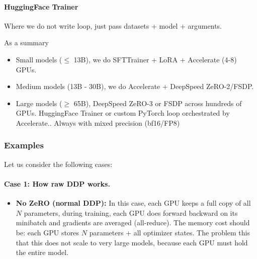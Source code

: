 \documentclass[11pt]{article}  %
\begin{document}
\paragraph{HuggingFace Trainer}
Where we do not write loop, just pass datasets + model + arguments.

As a summary 
\begin{itemize}
  \item Small models ($\leq$ 13B), we do SFTTrainer + LoRA + Accelerate (4-8) GPUs.
  \item Medium models (13B - 30B), we do Accelerate + DeepSpeed ZeRO-2/FSDP.
  \item Large models ($\geq$ 65B), DeepSpeed ZeRO-3 or FSDP across hundreds of GPUs. HuggingFace Trainer or custom PyTorch loop orchestrated by Accelerate.. Always with mixed precision (bf16/FP8)
\end{itemize}


\subsubsection{Examples}
Let us consider the following cases:

\paragraph{Case 1: How raw DDP works.}
\begin{itemize}
  \item \textbf{No ZeRO (normal DDP):} In this case, each GPU keeps a full copy of all $N$ parameters, during training, each GPU does forward backward on its minibatch and gradients are averaged (all-reduce).
  The memory cost should be: each GPU stores $N$ parameters + all optimizer states.
  The problem this that this does not scale to very large models, because each GPU must hold the entire model.
\end{itemize}
\end{document}
